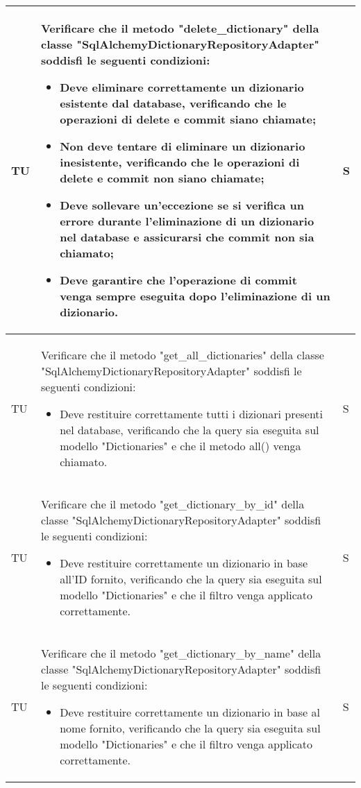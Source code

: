 \begin{adjustwidth}{-0.5cm}{-0.5cm}
\begin{longtable}{|P{1.5cm}|>{\raggedright}P{9.5cm}|>{\arraybackslash}P{1.5cm}|}
	\hline TU & Verificare che il metodo "delete\_dictionary" della classe "SqlAlchemyDictionaryRepositoryAdapter" soddisfi le seguenti condizioni:
	\begin{itemize}
		\item Deve eliminare correttamente un dizionario esistente dal database, verificando che le operazioni di delete e commit siano chiamate;
		\item Non deve tentare di eliminare un dizionario inesistente, verificando che le operazioni di delete e commit non siano chiamate;
		\item Deve sollevare un'eccezione se si verifica un errore durante l'eliminazione di un dizionario nel database e assicurarsi che commit non sia chiamato;
		\item Deve garantire che l'operazione di commit venga sempre eseguita dopo l'eliminazione di un dizionario.
	\end{itemize} & S \\

	\hline TU & Verificare che il metodo "get\_all\_dictionaries" della classe "SqlAlchemyDictionaryRepositoryAdapter" soddisfi le seguenti condizioni:
	\begin{itemize}
		\item Deve restituire correttamente tutti i dizionari presenti nel database, verificando che la query sia eseguita sul modello "Dictionaries" e che il metodo all() venga chiamato.
	\end{itemize} & S \\

	\hline TU & Verificare che il metodo "get\_dictionary\_by\_id" della classe "SqlAlchemyDictionaryRepositoryAdapter" soddisfi le seguenti condizioni:
	\begin{itemize}
		\item Deve restituire correttamente un dizionario in base all'ID fornito, verificando che la query sia eseguita sul modello "Dictionaries" e che il filtro venga applicato correttamente.
	\end{itemize} & S \\

	\hline TU & Verificare che il metodo "get\_dictionary\_by\_name" della classe "SqlAlchemyDictionaryRepositoryAdapter" soddisfi le seguenti condizioni:
	\begin{itemize}
		\item Deve restituire correttamente un dizionario in base al nome fornito, verificando che la query sia eseguita sul modello "Dictionaries" e che il filtro venga applicato correttamente.
	\end{itemize} & S \\


\end{longtable}
\end{adjustwidth}
